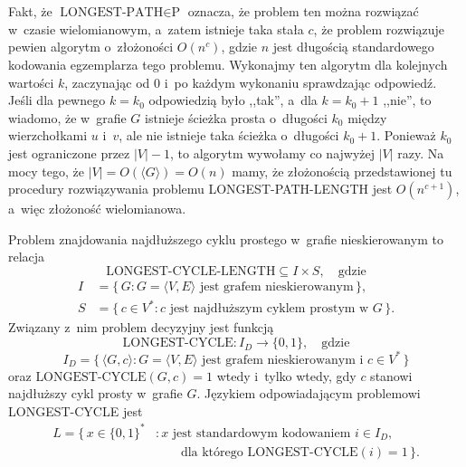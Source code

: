 \newcommand{\Pclass}{\text{P}}
\newcommand{\NPclass}{\text{NP}}
\newcommand{\coNPclass}{\text{co-NP}}

\chapter{\singledash{\NPclass}{zupełność}}



\exercise %
Fakt, że $\text{LONGEST-PATH}\in\Pclass$ oznacza, że problem ten można rozwiązać w~czasie wielomianowym, a~zatem istnieje taka stała $c$, że problem rozwiązuje pewien algorytm o~złożoności $O(n^c)$, gdzie $n$ jest długością standardowego kodowania egzemplarza tego problemu.
Wykonajmy ten algorytm dla kolejnych wartości $k$, zaczynając od 0 i~po każdym wykonaniu sprawdzając odpowiedź.
Jeśli dla pewnego $k=k_0$ odpowiedzią było ,,tak'', a~dla $k=k_0+1$ ,,nie'', to wiadomo, że w~grafie $G$ istnieje ścieżka prosta o~długości $k_0$ między wierzchołkami $u$ i~$v$, ale nie istnieje taka ścieżka o~długości $k_0+1$.
Ponieważ $k_0$ jest ograniczone przez $|V|-1$, to algorytm wywołamy co najwyżej $|V|$ razy.
Na mocy tego, że $|V|=O(\langle G\rangle)=O(n)$ mamy, że złożonością przedstawionej tu procedury rozwiązywania problemu LONGEST-PATH-LENGTH jest $O(n^{c+1})$, a~więc złożoność wielomianowa.

\exercise %
Problem znajdowania najdłuższego cyklu prostego w~grafie nieskierowanym to relacja
\[
	\text{LONGEST-CYCLE-LENGTH}\subseteq I\times S, \quad \text{gdzie}
\]
\begin{align*}
	I &= \bigl\{\,G:G=\langle V,E\rangle\text{ jest grafem nieskierowanym}\,\bigr\}, \\
	S &= \bigl\{\,c\in V^*\!:c\text{ jest najdłuższym cyklem prostym w~$G$}\,\bigr\}.
\end{align*}
Związany z~nim problem decyzyjny jest funkcją
\[
	\text{LONGEST-CYCLE}\colon I_D\to\{0,1\}, \quad \text{gdzie}
\]
\[
	I_D = \bigl\{\,\langle G,c\rangle:G=\langle V,E\rangle\text{ jest grafem nieskierowanym i~}c\in V^*\,\bigr\}
\]
oraz $\text{LONGEST-CYCLE}(G,c)=1$ wtedy i~tylko wtedy, gdy $c$ stanowi najdłuższy cykl prosty w~grafie $G$.
Językiem odpowiadającym problemowi LONGEST-CYCLE jest
\[
	\begin{split}
		L = \bigl\{\,x\in\{0,1\}^*\!&:x\text{ jest standardowym kodowaniem $i\in I_D$,} \\
		&\qquad \text{dla którego }\text{LONGEST-CYCLE}(i)=1\,\bigr\}.
	\end{split}
\]

